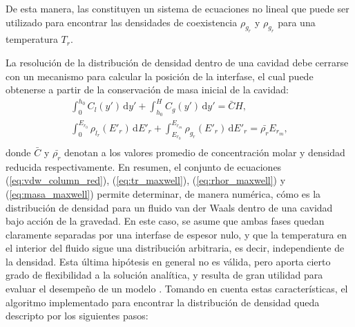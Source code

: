 De esta manera, las  constituyen un sistema de ecuaciones no lineal que puede ser utilizado para encontrar las densidades de coexistencia $\rho_{g_r}$ y $\rho_{g_r}$ para una temperatura $T_r$.

La resoluci\'on de la distribuci\'on de densidad dentro de una cavidad debe cerrarse con un mecanismo para calcular la posici\'on de la interfase, el cual puede obtenerse a partir de la conservaci\'on de masa inicial de la cavidad:
\begin{equation}
	\begin{gathered}
		\int_{0}^{h_0} C_l(y') \, \mbox{d}y' + \int_{h_0}^{H} C_g(y') \, \mbox{d}y' = \bar{C}H ,\\[3mm]
		\int_{0}^{E_{r_0}} \rho_{l_r} (E'_r) \, \mbox{d}E'_r + \int_{E_{r_0}}^{E_{r_m}} \rho_{g_r}(E'_r) \, \mbox{d}E'_r = \bar{\rho_r}E_{r_m}, \\
	\end{gathered}
	\label{eq:masa_maxwell}
\end{equation}
donde $\bar{C}$ y $\bar{\rho_r}$ denotan a los valores promedio de concentraci\'on molar y densidad reducida respectivamente. En resumen, el conjunto de ecuaciones (\ref{eq:vdw_column_red}), (\ref{eq:tr_maxwell}), (\ref{eq:rhor_maxwell}) y (\ref{eq:masa_maxwell}) permite determinar, de manera num\'erica, c\'omo es la distribuci\'on de densidad para un fluido van der Waals dentro de una cavidad  bajo acci\'on de la gravedad. En este caso, se asume que ambas fases quedan claramente separadas por una interfase de espesor nulo, y que la temperatura en el interior del fluido sigue una distribuci\'on arbitraria, es decir, independiente de la densidad.  Esta \'ultima hip\'otesis en general no es v\'alida, pero aporta cierto grado de flexibilidad a la soluci\'on anal\'itica, y resulta de gran utilidad para evaluar el desempe\~no de un modelo \pp{}. Tomando en cuenta estas caracter\'isticas, el algoritmo implementado para encontrar la distribuci\'on de densidad queda descripto por los siguientes pasos:

